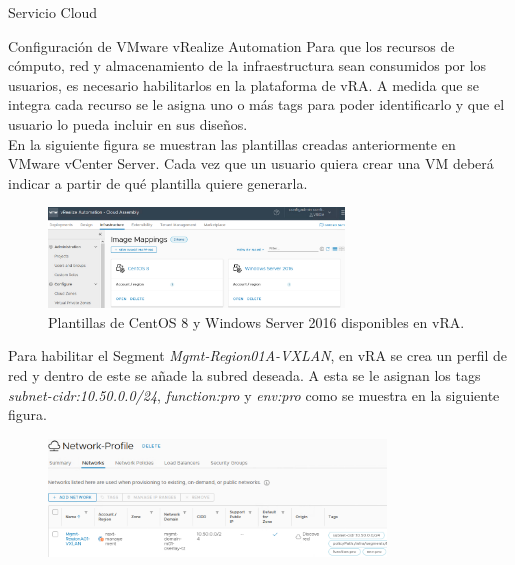 \begin{subsection}{Servicio Cloud}
    \begin{subsubsection}{Configuración de VMware vRealize Automation}
        Para que los recursos de cómputo, red y almacenamiento de la infraestructura sean consumidos por los usuarios, es necesario habilitarlos en la plataforma de vRA. A medida que se integra cada recurso se le asigna uno o más tags para poder identificarlo y que el usuario lo pueda incluir en sus diseños.
        \\ 
        En la siguiente figura se muestran las plantillas creadas anteriormente en VMware vCenter Server. Cada vez que un usuario quiera crear una VM deberá indicar a partir de qué plantilla quiere generarla.
        \begin{figure}[h]
            \centering
            \includegraphics[width=0.7\textwidth]{imaxes/pruebaconcepto/vrealize/image-mappings.png}
            \caption{Plantillas de CentOS 8 y Windows Server 2016 disponibles en vRA.}
            \label{fig:image-mapping}
        \end{figure}
        \FloatBarrier
        Para habilitar el Segment \textit{Mgmt-Region01A-VXLAN}, en vRA se crea un perfil de red y dentro de este se añade la subred deseada. A esta se le asignan los tags \textit{subnet-cidr:10.50.0.0/24}, \textit{function:pro} y \textit{env:pro} como se muestra en la siguiente figura.
        \begin{figure}[h]
            \centering
            \includegraphics[width=0.8\textwidth]{imaxes/pruebaconcepto/vrealize/net-profile-MGMT.png}

\end{figure}
\end{subsubsection}
\end{subsection}
